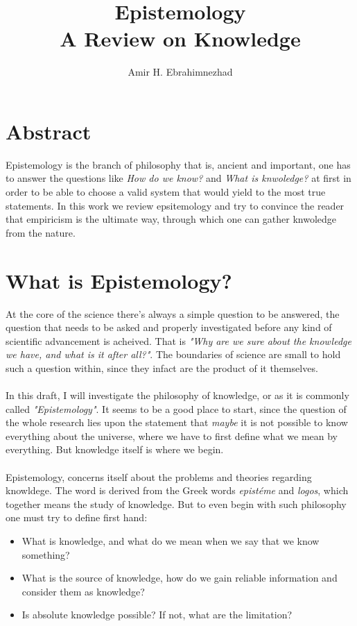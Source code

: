 \documentclass[9pt,a4paper,twocolumn]{article}
\title{Epistemology \\ \large A Review on Knowledge}
\author{Amir H. Ebrahimnezhad}
\date{}
\newcounter{theo}
\newcounter{def}
\begin{document}
        \maketitle
        \tableofcontents
        \section*{Abstract}
                Epistemology is the branch of philosophy that is, ancient and important, one has to answer the questions like \textit{How do we know?} and \textit{What is knwoledge?} at first in order to be able to choose a valid system that would yield to the most true statements. In this work we review epsitemology and try to convince the reader that empiricism is the ultimate way, through which one can gather knwoledge from the nature.
        \section{What is Epistemology?}
            \indent At the core of the science there's always a simple question to be answered, the question that needs to be asked and properly investigated before any kind of scientific advancement is acheived. That is \textit{"Why are we sure about the knowledge we have, and what is it after all?"}. The boundaries of science are small to hold such a question within, since they infact are the product of it themselves.
            \\
            \\
            \indent In this draft, I will investigate the philosophy of knowledge, or as it is commonly called \textit{"Epistemology"}. It seems to be a good place to start, since the question of the whole research lies upon the statement that \textit{maybe} it is not possible to know everything about the universe, where we have to first define what we mean by everything. But knowledge itself is where we begin.
            \\
            \\
            \indent Epistemology, concerns itself about the problems and theories regarding knowldege. The word is derived from the Greek words \textit{epistéme} and \textit{logos}, which together means the study of knowledge. But to even begin with such philosophy one must try to define first hand:
            \begin{itemize}
                \item What is knowledge, and what do we mean when we say that we know something?
                \item What is the source of knowledge, how do we gain reliable information and consider them as knowledge?
                \item Is absolute knowledge possible? If not, what are the limitation?\cite{CW/E}
            \end{itemize}
\end{document}
